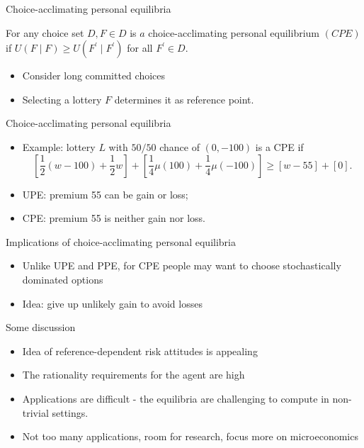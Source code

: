 \documentclass[11pt, aspectratio=169]{beamer}
\begin{document}
\begin{frame}{Choice-acclimating personal equilibria}

    \begin{definition}[CPE]
        For any choice set $D, F \in D$ is $a$ choice-acclimating personal equilibrium $(C P E)$
        if $U(F \mid F) \geq U\left(F^{\prime} \mid F^{\prime}\right)$ for all $F^{\prime} \in D$.
    \end{definition}\bigskip
     \begin{itemize}
        \item Consider long committed choices\medskip
        \item  Selecting a lottery $F$ determines it as reference point.\medskip
	\end{itemize}
\end{frame}

\begin{frame}{Choice-acclimating personal equilibria}
     \begin{itemize}
           \item Example: lottery $L$ with $50/50$ chance of $(0,-100)$ is a CPE if
  \[
    \left[\frac{1}{2}(w-100)+\frac{1}{2} w\right]
   +\left[\frac{1}{4} \mu(100)+\frac{1}{4} \mu(-100)\right]
     \geq[w-55]+[0] .
\]
        \item UPE: premium 55 can be gain or loss;\medskip
        \item CPE: premium 55 is neither gain nor loss.\medskip
	\end{itemize}
\end{frame}

\begin{frame}{Implications of choice-acclimating personal equilibria}
    \begin{itemize}
        \item Unlike UPE and PPE, for CPE people may want to choose stochastically dominated options\medskip
        \item Idea: give up unlikely gain to avoid losses\medskip
	\end{itemize}
\end{frame}



\begin{frame}{Some discussion}
    \begin{itemize}
        \item Idea of reference-dependent risk attitudes is appealing\medskip
        \item The rationality requirements for the agent are high\medskip
        \item Applications are difficult - the equilibria are challenging to compute in non-trivial settings.\medskip
        \item Not too many applications, room for research, focus more on microeconomics\medskip
	\end{itemize}
\end{frame}
\end{document}
